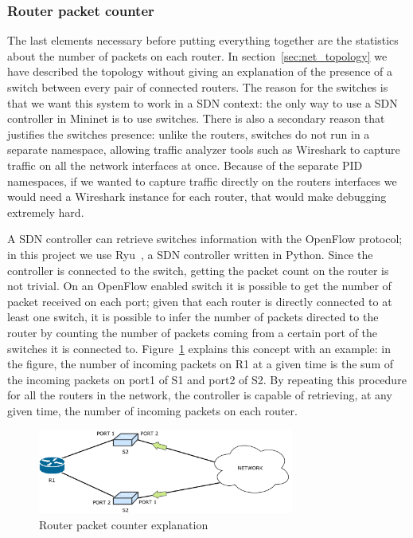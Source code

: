 \subsubsection{Router packet counter}
\label{sec:packet_counter}
The last elements necessary before putting everything together are the statistics about the number of packets on each router. In section~\ref{sec:net_topology} we have described the topology without giving an explanation of the presence of a switch between every pair of connected routers. The reason for the switches is that we want this system to work in a SDN context: the only way to use a SDN controller in Mininet is to use switches. There is also a secondary reason that justifies the switches presence: unlike the routers, switches do not run in a separate namespace, allowing traffic analyzer tools such as Wireshark to capture traffic on all the network interfaces at once. Because of the separate PID namespaces, if we wanted to capture traffic directly on the routers interfaces we would need a Wireshark instance for each router, that would make debugging extremely hard. 

A SDN controller can retrieve switches information with the OpenFlow protocol; in this project we use Ryu~\cite{ryu}, a SDN controller written in Python. Since the controller is connected to the switch, getting the packet count on the router is not trivial. On an OpenFlow enabled switch it is possible to get the number of packet received on each port; given that each router is directly connected to at least one switch, it is possible to infer the number of packets directed to the router by counting the number of packets coming from a certain port of the switches it is connected to. Figure~\ref{fig:packet_counter} explains this concept with an example: in the figure, the number of incoming packets on R1 at a given time is the sum of the incoming packets on port1 of S1 and port2 of S2. By repeating this procedure for all the routers in the network, the controller is capable of retrieving, at any given time, the number of incoming packets on each router.
\begin{figure}[h]
\centering
\includegraphics[width=0.75\textwidth]{img/packet_counter}
\caption{Router packet counter explanation}
\label{fig:packet_counter}
\end{figure}

